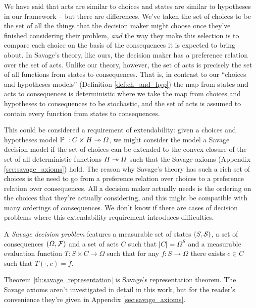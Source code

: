We have said that acts are similar to choices and states are similar to hypotheses in our framework -- but there are differences. We've taken the set of choices to be the set of all the things that the decision maker might choose once they've finished considering their problem, \emph{and} the way they make this selection is to compare each choice on the basis of the consequences it is expected to bring about. In Savage's theory, like ours, the decision maker has a preference relation over the set of acts. Unlike our theory, however, the set of acts is precisely the set of all functions from states to consequences. That is, in contrast to our ``choices and hypotheses models'' (Definition \ref{def:ch_and_hyp}) the map from states and acts to consequences is deterministic where we take the map from choices and hypotheses to consequences to be stochastic, and the set of acts is assumed to contain every function from states to consequences.

This could be considered a requirement of extendability: given a choices and hypotheses model $\mathbb{P}_\cdot:C\times H\rightarrowtriangle \Omega$, we might consider the model a Savage decision model if the set of choices can be extended to the convex closure of the set of all deterministic functions $H\rightarrowtriangle \Omega$ such that the Savage axioms (Appendix \ref{sec:savage_axioms}) hold. The reason why Savage's theory has such a rich set of choices is the need to go from a preference relation over choices to a preference relation over consequences. All a decision maker actually needs is the ordering on the choices that they're actually considering, and this might be compatible with many orderings of consequences. We don't know if there are cases of decision problems where this extendability requirement introduces difficulties. 

\begin{definition}
A \emph{Savage decision problem} features a measurable set of states $(S,\mathcal{S})$, a set of consequences $(\Omega,\mathcal{F})$ and a set of acts $C$ such that $|C|=\Omega^S$ and a measurable evaluation function $T:S\times C\to \Omega$ such that for any $f:S\to \Omega$ there exists $c\in C$ such that $T(\cdot,c)=f$.
\end{definition}

Theorem \ref{th:savage_representation} is Savage's representation theorem. The Savage axioms aren't investigated in detail in this work, but for the reader's convenience they're given in Appendix \ref{sec:savage_axioms}.

